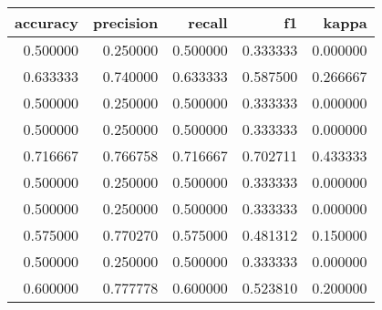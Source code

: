 \begin{tabular}{rrrrr}
\toprule
accuracy & precision & recall & f1 & kappa \\
\midrule
0.500000 & 0.250000 & 0.500000 & 0.333333 & 0.000000 \\
0.633333 & 0.740000 & 0.633333 & 0.587500 & 0.266667 \\
0.500000 & 0.250000 & 0.500000 & 0.333333 & 0.000000 \\
0.500000 & 0.250000 & 0.500000 & 0.333333 & 0.000000 \\
0.716667 & 0.766758 & 0.716667 & 0.702711 & 0.433333 \\
0.500000 & 0.250000 & 0.500000 & 0.333333 & 0.000000 \\
0.500000 & 0.250000 & 0.500000 & 0.333333 & 0.000000 \\
0.575000 & 0.770270 & 0.575000 & 0.481312 & 0.150000 \\
0.500000 & 0.250000 & 0.500000 & 0.333333 & 0.000000 \\
0.600000 & 0.777778 & 0.600000 & 0.523810 & 0.200000 \\
\bottomrule
\end{tabular}
